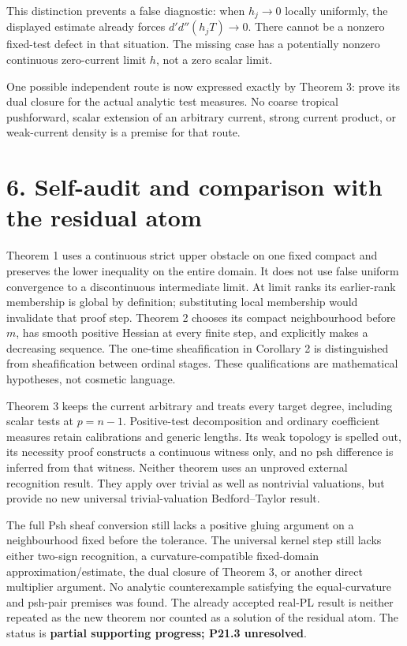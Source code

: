 \documentclass[
  11pt,
]{article}
\begin{document}
This distinction prevents a false diagnostic: when \(h_j\to0\) locally
uniformly, the displayed estimate already forces \(d'd''(h_jT)\to0\).
There cannot be a nonzero fixed-test defect in that situation. The
missing case has a potentially nonzero continuous zero-current limit
\(h\), not a zero scalar limit.

One possible independent route is now expressed exactly by Theorem 3:
prove its dual closure for the actual analytic test measures. No coarse
tropical pushforward, scalar extension of an arbitrary current, strong
current product, or weak-current density is a premise for that route.

\section{6. Self-audit and comparison with the residual
atom}\label{self-audit-and-comparison-with-the-residual-atom}

Theorem 1 uses a continuous strict upper obstacle on one fixed compact
and preserves the lower inequality on the entire domain. It does not use
false uniform convergence to a discontinuous intermediate limit. At
limit ranks its earlier-rank membership is global by definition;
substituting local membership would invalidate that proof step. Theorem
2 chooses its compact neighbourhood before \(m\), has smooth positive
Hessian at every finite step, and explicitly makes a decreasing
sequence. The one-time sheafification in Corollary 2 is distinguished
from sheafification between ordinal stages. These qualifications are
mathematical hypotheses, not cosmetic language.

Theorem 3 keeps the current arbitrary and treats every target degree,
including scalar tests at \(p=n-1\). Positive-test decomposition and
ordinary coefficient measures retain calibrations and generic lengths.
Its weak topology is spelled out, its necessity proof constructs a
continuous witness only, and no psh difference is inferred from that
witness. Neither theorem uses an unproved external recognition result.
They apply over trivial as well as nontrivial valuations, but provide no
new universal trivial-valuation Bedford--Taylor result.

The full Psh sheaf conversion still lacks a positive gluing argument on
a neighbourhood fixed before the tolerance. The universal kernel step
still lacks either two-sign recognition, a curvature-compatible
fixed-domain approximation/estimate, the dual closure of Theorem 3, or
another direct multiplier argument. No analytic counterexample
satisfying the equal-curvature and psh-pair premises was found. The
already accepted real-PL result is neither repeated as the new theorem
nor counted as a solution of the residual atom. The status is
\textbf{partial supporting progress; P21.3 unresolved}.
\end{document}
